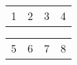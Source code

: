 \documentclass{article}
\begin{document}
\begin{figure}
\parbox{1.5cm}
{
\begin{tabular}{| l | c | c | c |}
1 & 2 & 3 & 4
\end{tabular}
}
\qquad
\begin{minipage}{1.5cm}
\begin{tabular}{l | c | c | c |}
5 & 6 & 7 & 8
\end{tabular}
\end{minipage}
\end{figure}
\end{document}
